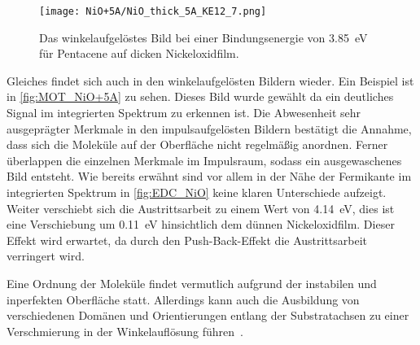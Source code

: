         \begin{figure}
            \centering
            \texttt{[image: NiO+5A/NiO\_thick\_5A\_KE12\_7.png]}
            \caption{Das winkelaufgelöstes Bild bei einer Bindungsenergie von \SI{3.85}{\electronvolt} für Pentacene auf dicken Nickeloxidfilm.} %
            \label{fig:MOT_NiO+5A}
        \end{figure}
        Gleiches findet sich auch in den winkelaufgelösten Bildern wieder.
        Ein Beispiel ist in \autoref{fig:MOT_NiO+5A} zu sehen.
        Dieses Bild wurde gewählt da ein deutliches Signal im integrierten Spektrum zu erkennen ist.
        Die Abwesenheit sehr ausgeprägter Merkmale in den impulsaufgelösten Bildern bestätigt die Annahme, dass sich die Moleküle auf der Oberfläche nicht regelmäßig anordnen.
        Ferner überlappen die einzelnen Merkmale im Impulsraum, sodass ein ausgewaschenes Bild entsteht.
        Wie bereits erwähnt sind vor allem in der Nähe der Fermikante im integrierten Spektrum in \autoref{fig:EDC_NiO} keine klaren Unterschiede aufzeigt.
        Weiter verschiebt sich die Austrittsarbeit zu einem Wert von \SI{4.14}{\electronvolt}, dies ist eine Verschiebung um \SI{0.11}{\electronvolt} hinsichtlich dem dünnen Nickeloxidfilm.
        Dieser Effekt wird erwartet, da durch den Push-Back-Effekt die Austrittsarbeit verringert wird.

        Eine Ordnung der Moleküle findet vermutlich aufgrund der instabilen und inperfekten Oberfläche statt.
        Allerdings kann auch die Ausbildung von verschiedenen Domänen und Orientierungen entlang der Substratachsen zu einer Verschmierung in der Winkelauflösung führen~\cite{scholl_chapter_2018}.

